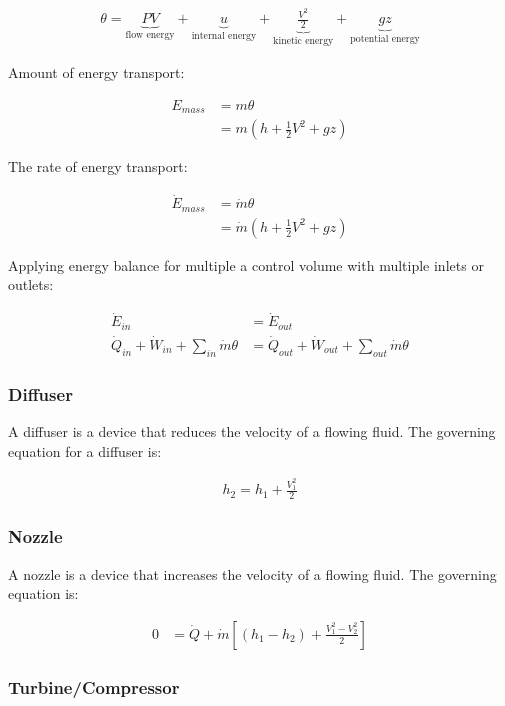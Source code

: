 \begin{align}
\theta =
\underbrace{PV}_{\text{flow energy}}
+
\underbrace{u}_{\text{internal energy}}
+
\underbrace{\frac{V^2}{2}}_{\text{kinetic energy}}
+
\underbrace{gz}_{\text{potential energy}}
\end{align}

Amount of energy transport:

\begin{align}
E_{mass} &= m\theta\\
         &= m(h+\frac12V^2+gz)
\end{align}

The rate of energy transport:


\begin{align}
\dot{E}_{mass} &= \dot{m}\theta\\
               &= \dot{m}(h+\frac12V^2+gz)
\end{align}


Applying energy balance for multiple a control volume with multiple inlets or outlets:

\begin{align}
\dot{E}_{in} &= \dot{E}_{out}\\ 
\dot{Q}_{in} + \dot{W}_{in} + \sum_{in}\dot{m}\theta &=
\dot{Q}_{out} + \dot{W}_{out} + \sum_{out}\dot{m}\theta
\end{align}

\subsubsection{Diffuser}
A diffuser is a device that reduces the velocity of a flowing fluid. The governing equation for a diffuser is:

\begin{align}
	h_2 = h_1 + \frac{V_1^2}{2}
\end{align}

\subsubsection{Nozzle}
A nozzle is a device that increases the velocity of a flowing fluid. The governing equation is:

\begin{align}
	0&=\dot{Q} + \dot{m}
	\left[
	(h_1-h_2)
	+
	\frac{V_1^2-V_2^2}{2}
	\right]
\end{align}

\subsubsection{Turbine/Compressor}

